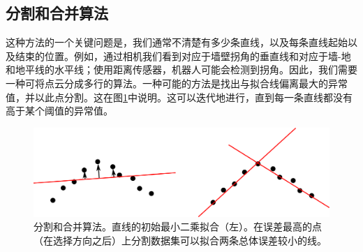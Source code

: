 
\subsection{分割和合并算法}

这种方法的一个关键问题是，我们通常不清楚有多少条直线，以及每条直线起始以及结束的位置。例如，通过相机我们看到对应于墙壁拐角的垂直线和对应于墙-地和地平线的水平线；使用距离传感器，机器人可能会检测到拐角。因此，我们需要一种可将点云分成多行的算法。一种可能的方法是找出与拟合线偏离最大的异常值，并以此点分割。这在图\ref{fig:splitandmerge}中说明。这可以迭代地进行，直到每一条直线都没有高于某个阈值的异常值。


\begin{figure}
\includegraphics[width=\textwidth]{figs/splitandmerge}
\caption{
分割和合并算法。直线的初始最小二乘拟合（左）。在误差最高的点（在选择方向之后）上分割数据集可以拟合两条总体误差较小的线。
\label{fig:splitandmerge}} 
\end{figure}

